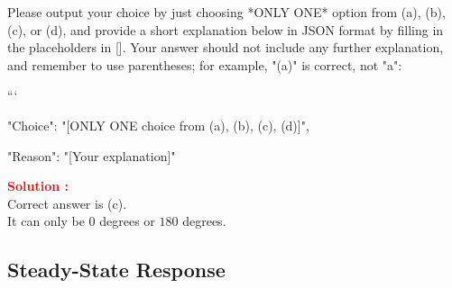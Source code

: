 \documentclass[12pt]{article}
\begin{document}
Please output your choice by just choosing *ONLY ONE* option from (a), (b), (c), or (d), and provide a short explanation below in JSON format by filling in the placeholders in []. Your answer should not include any further explanation, and remember to use parentheses; for example, "(a)" is correct, not "a": 

```
{

"Choice": "[ONLY ONE choice from (a), (b), (c), (d)]",

"Reason": "[Your explanation]"

}


\textbf{\textcolor{red}{Solution :}}\\
Correct answer is (c).\\
It can only be \(0\) degrees or \(180\) degrees.
\clearpage

\subsection{Steady-State Response}
\end{document}
